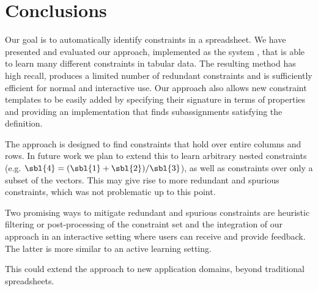 
\section{Conclusions}\label{sec:tacle_conclusions}

Our goal is to automatically identify constraints in a spreadsheet.
We have presented and evaluated our approach, implemented as the system \sname, that is able to learn many different constraints in tabular data.
The resulting method has high recall, produces a limited number of redundant constraints and is sufficiently efficient for normal and interactive use.
Our approach also allows new constraint templates to be easily added by specifying their signature in terms of properties and providing an implementation that finds subassignments satisfying the definition.

The approach is designed to find constraints that hold over entire columns and rows. In future work we plan to extend this to learn arbitrary nested constraints (e.g. $\sbl{4} = (\sbl{1} + \sbl{2}) / \sbl{3}$), as well as constraints over only a subset of the vectors. This may give rise to more redundant and spurious constraints, which was not problematic up to this point.

Two promising ways to mitigate redundant and spurious constraints are heuristic filtering or post-processing of the constraint set and the integration of our approach in an interactive setting where users can receive and provide feedback.
The latter is more similar to an active learning setting.

This could extend the approach to new application domains, beyond traditional spreadsheets.


